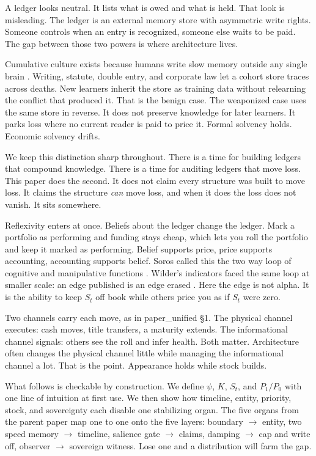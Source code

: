 \documentclass[11pt]{article}
\begin{document}
A ledger looks neutral. It lists what is owed and what is held. That look is misleading. The ledger is an external memory store with asymmetric write rights. Someone controls when an entry is recognized, someone else waits to be paid. The gap between those two powers is where architecture lives.

Cumulative culture exists because humans write slow memory outside any single brain \citep{tomasello,henrich}. Writing, statute, double entry, and corporate law let a cohort store traces across deaths. New learners inherit the store as training data without relearning the conflict that produced it. That is the benign case. The weaponized case uses the same store in reverse. It does not preserve knowledge for later learners. It parks loss where no current reader is paid to price it. Formal solvency holds. Economic solvency drifts.

We keep this distinction sharp throughout. There is a time for building ledgers that compound knowledge. There is a time for auditing ledgers that move loss. This paper does the second. It does not claim every structure was built to move loss. It claims the structure \emph{can} move loss, and when it does the loss does not vanish. It sits somewhere.

Reflexivity enters at once. Beliefs about the ledger change the ledger. Mark a portfolio as performing and funding stays cheap, which lets you roll the portfolio and keep it marked as performing. Belief supports price, price supports accounting, accounting supports belief. Soros called this the two way loop of cognitive and manipulative functions \citep{soros}. Wilder's indicators faced the same loop at smaller scale: an edge published is an edge erased \citep{wilder1978}. Here the edge is not alpha. It is the ability to keep $S_t$ off book while others price you as if $S_t$ were zero.

Two channels carry each move, as in paper\_unified \S1. The physical channel executes: cash moves, title transfers, a maturity extends. The informational channel signals: others see the roll and infer health. Both matter. Architecture often changes the physical channel little while managing the informational channel a lot. That is the point. Appearance holds while stock builds.

What follows is checkable by construction. We define $\psi$, $K$, $S_t$, and $P_1/P_0$ with one line of intuition at first use. We then show how timeline, entity, priority, stock, and sovereignty each disable one stabilizing organ. The five organs from the parent paper map one to one onto the five layers: boundary $\to$ entity, two speed memory $\to$ timeline, salience gate $\to$ claims, damping $\to$ cap and write off, observer $\to$ sovereign witness. Lose one and a distribution will farm the gap.
\end{document}
